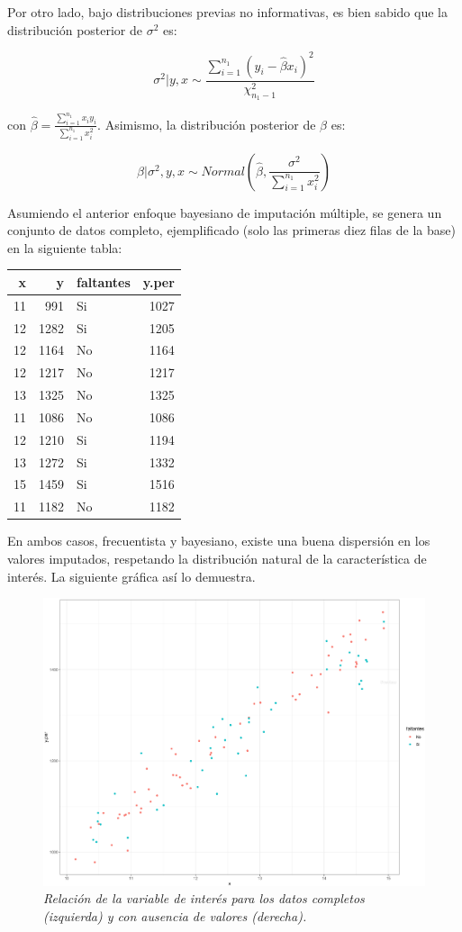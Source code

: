 \documentclass[
  10pt,
  spanish,
]{book}
\begin{document}
Por otro lado, bajo distribuciones previas no informativas, es bien sabido que la distribución posterior de \(\sigma^2\) es:

\[
\sigma^2| y, x  \sim \frac{\sum_{i = 1}^{n_1} (y_i - \hat{\beta} x_i)^2}{\chi ^2_{n_1-1}}
\]

con \(\hat{\beta} = \frac{\sum_{i = 1}^{n_1} x_i y_i}{\sum_{i = 1}^{n_1} x_i^2}\). Asimismo, la distribución posterior de \(\beta\) es:

\[
\beta | \sigma^2, y, x \sim Normal \left(\hat{\beta}, \frac{\sigma^2}{\sum_{i = 1}^{n_1} x_i^2} \right)
\]

Asumiendo el anterior enfoque bayesiano de imputación múltiple, se genera un conjunto de datos completo, ejemplificado (solo las primeras diez filas de la base) en la siguiente tabla:

\begin{longtable}[]{@{}rrlr@{}}
\toprule
x & y & faltantes & y.per \\
\midrule
\endhead
11 & 991 & Si & 1027 \\
12 & 1282 & Si & 1205 \\
12 & 1164 & No & 1164 \\
12 & 1217 & No & 1217 \\
13 & 1325 & No & 1325 \\
11 & 1086 & No & 1086 \\
12 & 1210 & Si & 1194 \\
13 & 1272 & Si & 1332 \\
15 & 1459 & Si & 1516 \\
11 & 1182 & No & 1182 \\
\bottomrule
\end{longtable}

En ambos casos, frecuentista y bayesiano, existe una buena dispersión en los valores imputados, respetando la distribución natural de la característica de interés. La siguiente gráfica así lo demuestra.

\begin{figure}
\centering
\includegraphics{Pics/im4.png}
\caption{\emph{Relación de la variable de interés para los datos completos (izquierda) y con ausencia de valores (derecha).}}
\end{figure}
\end{document}
